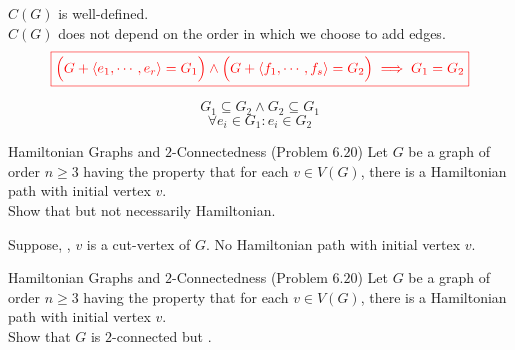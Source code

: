 \begin{frame}{}
  \begin{theorem}
    \begin{center}
      $C(G)$ is well-defined. \\[6pt] \pause
      $C(G)$ does not depend on the order in which we choose to add edges. 
      \pause
      \[
	\textcolor{red}{\boxed{\Big(G + \langle e_1, \cdots, e_r \rangle = G_1\Big) \land 
	\Big(G + \langle f_1, \cdots, f_s \rangle = G_2\Big) \implies G_1 = G_2}}
      \]
    \end{center}
  \end{theorem}

  \pause
  \[
    G_1 \subseteq G_2 \land G_2 \subseteq G_1
  \]
  \pause
  \[
    \forall e_i \in G_1: e_i \in G_2
  \]
  \pause
  \begin{center}
  \end{center}
\end{frame}

\begin{frame}{}
  \begin{exampleblock}{Hamiltonian Graphs and $2$-Connectedness (Problem $6.20$)}
    Let $G$ be a graph of order $n \ge 3$ having the property that
    for each $v \in V(G)$, there is a Hamiltonian path with initial vertex $v$. \\
    Show that  but not necessarily Hamiltonian.
  \end{exampleblock}

  \pause
  \begin{center}
  \end{center}

  \pause
  \begin{center}
    Suppose, , $v$ is a cut-vertex of $G$. \pause
    \pause
     No Hamiltonian path with initial vertex $v$.
  \end{center}
\end{frame}

\begin{frame}{}
  \begin{exampleblock}{Hamiltonian Graphs and $2$-Connectedness (Problem $6.20$)}
    Let $G$ be a graph of order $n \ge 3$ having the property that
    for each $v \in V(G)$, there is a Hamiltonian path with initial vertex $v$. \\
    Show that $G$ is $2$-connected but .
  \end{exampleblock}

  \pause
\end{frame}
